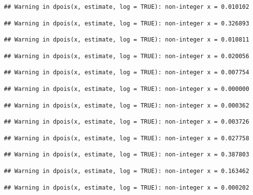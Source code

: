 \documentclass[]{article}
\begin{document}
\begin{verbatim}
## Warning in dpois(x, estimate, log = TRUE): non-integer x = 0.010102
\end{verbatim}

\begin{verbatim}
## Warning in dpois(x, estimate, log = TRUE): non-integer x = 0.326893
\end{verbatim}

\begin{verbatim}
## Warning in dpois(x, estimate, log = TRUE): non-integer x = 0.010811
\end{verbatim}

\begin{verbatim}
## Warning in dpois(x, estimate, log = TRUE): non-integer x = 0.020056
\end{verbatim}

\begin{verbatim}
## Warning in dpois(x, estimate, log = TRUE): non-integer x = 0.007754
\end{verbatim}

\begin{verbatim}
## Warning in dpois(x, estimate, log = TRUE): non-integer x = 0.000000
\end{verbatim}

\begin{verbatim}
## Warning in dpois(x, estimate, log = TRUE): non-integer x = 0.000362
\end{verbatim}

\begin{verbatim}
## Warning in dpois(x, estimate, log = TRUE): non-integer x = 0.003726
\end{verbatim}

\begin{verbatim}
## Warning in dpois(x, estimate, log = TRUE): non-integer x = 0.027758
\end{verbatim}

\begin{verbatim}
## Warning in dpois(x, estimate, log = TRUE): non-integer x = 0.387803
\end{verbatim}

\begin{verbatim}
## Warning in dpois(x, estimate, log = TRUE): non-integer x = 0.163462
\end{verbatim}

\begin{verbatim}
## Warning in dpois(x, estimate, log = TRUE): non-integer x = 0.000202
\end{verbatim}
\end{document}
